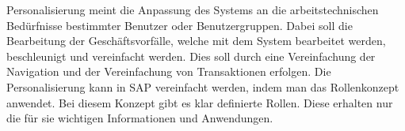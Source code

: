 \label{sec:Aufgabe 3}

Personalisierung meint die Anpassung des Systems an die arbeitstechnischen Bedürfnisse bestimmter Benutzer oder Benutzergruppen. Dabei soll die Bearbeitung der Geschäftsvorfälle, welche mit dem System bearbeitet werden, beschleunigt und vereinfacht werden. Dies soll durch eine Vereinfachung der Navigation und der Vereinfachung von Transaktionen erfolgen. Die Personalisierung kann in SAP vereinfacht werden, indem man das Rollenkonzept anwendet. Bei diesem Konzept gibt es klar definierte Rollen. Diese erhalten nur die für sie wichtigen Informationen und Anwendungen. 